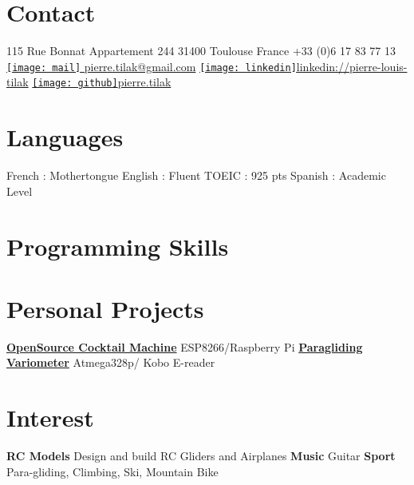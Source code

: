 \documentclass[a4paper]{friggeri-cv} %
\begin{document}


\begin{aside} %
\section{Contact}
115 Rue Bonnat
Appartement 244
31400 Toulouse
France
+33 (0)6 17 83 77 13
~
\href{mailto:pierre.tilak@gmail.com}{\texttt{[image: mail]} pierre.tilak@gmail.com}
\href{https://www.linkedin.com/pub/pierre-louis-tilak/96/162/a83}{\texttt{[image: linkedin]}linkedin://pierre-louis-tilak}
\href{https://github.com/tilaktilak}{\texttt{[image: github]}pierre.tilak}
\section{Languages}
French : Mothertongue
English : Fluent
TOEIC : 925 pts 
Spanish : Academic Level\bigskip\bigskip
\section{Programming Skills}
\bigskip\bigskip
\section{Personal Projects}
\href{https://github.com/tilaktilak/Inebriator}{\textbf{OpenSource Cocktail Machine}}
ESP8266/Raspberry Pi\bigskip
\href{https://github.com/tilaktilak/xcvario}{\textbf{Paragliding Variometer}}
Atmega328p/ Kobo E-reader\bigskip\bigskip
\section{Interest}
\textbf{RC Models} Design and build RC Gliders and Airplanes
\textbf{Music} Guitar
\textbf{Sport} Para-gliding, Climbing, Ski, Mountain Bike
\end{aside}
\end{document}

